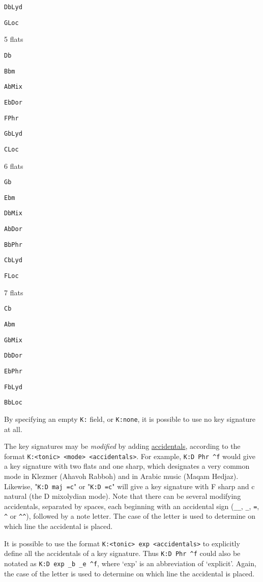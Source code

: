 \texttt{DbLyd}

\texttt{GLoc}

5 flats

\texttt{Db}

\texttt{Bbm}

\texttt{AbMix}

\texttt{EbDor}

\texttt{FPhr}

\texttt{GbLyd}

\texttt{CLoc}

6 flats

\texttt{Gb}

\texttt{Ebm}

\texttt{DbMix}

\texttt{AbDor}

\texttt{BbPhr}

\texttt{CbLyd}

\texttt{FLoc}

7 flats

\texttt{Cb}

\texttt{Abm}

\texttt{GbMix}

\texttt{DbDor}

\texttt{EbPhr}

\texttt{FbLyd}

\texttt{BbLoc}

By specifying an empty \texttt{K:} field, or \texttt{K:none}, it is
possible to use no key signature at all.

The key signatures may be \emph{modified} by adding
\protect\hyperlink{accidentals}{accidentals}, according to the format
\texttt{K:\textless{}tonic\textgreater{}\ \textless{}mode\textgreater{}\ \textless{}accidentals\textgreater{}}.
For example, \texttt{K:D\ Phr\ \^{}f} would give a key signature with
two flats and one sharp, which designates a very common mode in Klezmer
(Ahavoh Rabboh) and in Arabic music (Maqam Hedjaz). Likewise,
"\texttt{K:D\ maj\ =c}" or "\texttt{K:D\ =c}" will give a key signature
with F sharp and c natural (the D mixolydian mode). Note that there can
be several modifying accidentals, separated by spaces, each beginning
with an accidental sign (\texttt{\_\_}, \texttt{\_}, \texttt{=},
\texttt{\^{}} or \texttt{\^{}\^{}}), followed by a note letter. The case
of the letter is used to determine on which line the accidental is
placed.

It is possible to use the format
\texttt{K:\textless{}tonic\textgreater{}\ exp\ \textless{}accidentals\textgreater{}}
to explicitly define all the accidentals of a key signature. Thus
\texttt{K:D\ Phr\ \^{}f} could also be notated as
\texttt{K:D\ exp\ \_b\ \_e\ \^{}f}, where `exp' is an abbreviation of
`explicit'. Again, the case of the letter is used to determine on which
line the accidental is placed.

